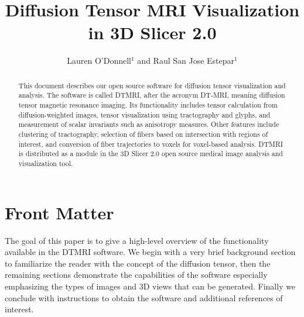 \documentclass{InsightArticle}
\title{Diffusion Tensor MRI Visualization in 3D Slicer 2.0}
\author{Lauren O'Donnell$^{1}$ and Raul San Jose Estepar$^{1}$}
\begin{document}
\ifpdf
\else
\fi


\maketitle


\ifhtml
\chapter*{Front Matter\label{front}}
\fi


\begin{abstract}
\noindent
This document describes our open source software for diffusion tensor
visualization and analysis.  The software is called DTMRI, after the
acronym DT-MRI, meaning diffusion tensor magnetic resonance imaging.
Its functionality includes tensor calculation from diffusion-weighted
images, tensor visualization using tractography and glyphs, and
measurement of scalar invariants such as anisotropy measures.  Other
features include clustering of tractography, selection of fibers based
on intersection with regions of interest, and conversion of fiber
trajectories to voxels for voxel-based analysis.  DTMRI is distributed
as a module in the 3D Slicer 2.0 open source medical image analysis
and visualization tool.

\end{abstract}

\tableofcontents

The goal of this paper is to give a high-level overview of the
functionality available in the DTMRI software.  We begin with a very
brief background section to familiarize the reader with the concept of
the diffusion tensor, then the remaining sections demonstrate the
capabilities of the software especially emphasizing the types of
images and 3D views that can be generated.  Finally we conclude with
instructions to obtain the software and additional references of
interest.
\end{document}
